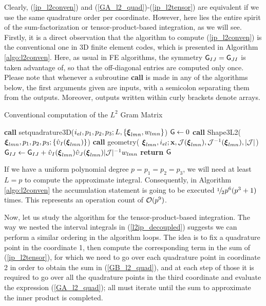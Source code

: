 Clearly, (\ref{ip_l2conven}) and (\ref{GA_l2_quad})-(\ref{ip_l2tensor}) are equivalent if we use the same quadrature order per coordinate. However, here lies the entire spirit of the sum-factorization or tensor-product-based integration, as we will see. Firstly, it is a direct observation that the algorithm to compute (\ref{ip_l2conven}) is the conventional one in 3D finite element codes, which is presented in Algorithm \ref{algo:l2conven}. Here, as usual in FE algorithms, the symmetry $\mathsf{G}_{IJ}=\mathsf{G}_{JI}$ is taken advantage of, so that the off-diagonal entries are computed only once. {\color{blue}Please note that whenever a subroutine \textbf{call} is made in any of the algorithms below, the first arguments given are inputs, with a semicolon separating them from the outputs. Moreover, outputs written within curly brackets denote arrays.}
% 
\begin{algorithm}[ht]
\caption{Conventional computation of the $L^2$ Gram Matrix}\label{algo:l2conven}
\begin{algorithmic}
\State\textbf{call }setquadrature3D($i_{el},p_1,p_2,p_3;L,\{\boldsymbol{\xi}_{lmn},w_{lmn}\}$)
\State $\mathsf{G}\gets 0$
            \State\textbf{call } Shape3L2($\boldsymbol{\xi}_{lmn},p_1,p_2,p_3;\{\hat{\upsilon}_I(\boldsymbol{\xi}_{lmn})\}$)
            \State\textbf{call } geometry( $\boldsymbol{\xi}_{lmn},i_{el};\mathbf{x},\mathcal{J}(\boldsymbol{\xi}_{lmn}),\mathcal{J}^{-1}(\boldsymbol{\xi}_{lmn}),|\mathcal{J}|$)
                    \State $\mathsf{G}_{IJ}\gets \mathsf{G}_{IJ}+\hat{\upsilon}_I(\boldsymbol{\xi}_{lmn})\hat{\upsilon}_J(\boldsymbol{\xi}_{lmn})|\mathcal{J}|^{-1}w_{lmn}$ 
                \EndFor
            \EndFor        
\EndFor
\State \textbf{return} $\mathsf{G}$
\EndProcedure
\end{algorithmic}
\end{algorithm}

If we have a uniform polynomial degree $p=p_1=p_2=p_3$, we will need at least $L=p$ to compute the approximate integral. Consequently, in Algorithm \ref{algo:l2conven} the accumulation statement is going to be executed $\onehalf p^6(p^3+1)$ times. This represents an operation count of $\mathcal{O}(p^9)$.

Now, let us study the algorithm for the tensor-product-based integration. The way we nested the interval integrals in (\ref{l2ip_decoupled}) suggests we can perform a similar ordering in the algorithm loops. The idea is to fix a quadrature point in the coordinate 1, then compute the corresponding term in the sum of (\ref{ip_l2tensor}), for which we need to go over each quadrature point in coordinate 2 in order to obtain the sum in (\ref{GB_l2_quad}), and at each step of those it is required to go over all the quadrature points in the third coordinate and evaluate the expression (\ref{GA_l2_quad}); all must iterate until the sum to approximate the inner product is completed.

